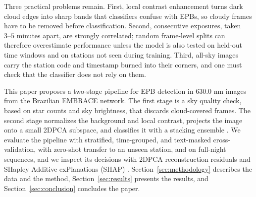 Three practical problems remain. First, local contrast enhancement turns dark cloud edges into sharp bands that classifiers confuse with EPBs, so cloudy frames have to be removed before classification. Second, consecutive exposures, taken $3\text{--}5$ minutes apart, are strongly correlated; random frame-level splits can therefore overestimate performance unless the model is also tested on held-out time windows and on stations not seen during training. Third, all-sky images carry the station code and timestamp burned into their corners, and one must check that the classifier does not rely on them.

This paper proposes a two-stage pipeline for EPB detection in $630.0\text{ nm}$ images from the Brazilian EMBRACE network. The first stage is a sky quality check, based on star counts and sky brightness, that discards cloud-covered frames. The second stage normalizes the background and local contrast, projects the image onto a small 2DPCA subspace, and classifies it with a stacking ensemble \cite{wolpert1992stacked}. We evaluate the pipeline with stratified, time-grouped, and text-masked cross-validation, with zero-shot transfer to an unseen station, and on full-night sequences, and we inspect its decisions with 2DPCA reconstruction residuals and SHapley Additive exPlanations (SHAP) \cite{lundberg2017unified}. Section~\ref{sec:methodology} describes the data and the method, Section~\ref{sec:results} presents the results, and Section~\ref{sec:conclusion} concludes the paper.
